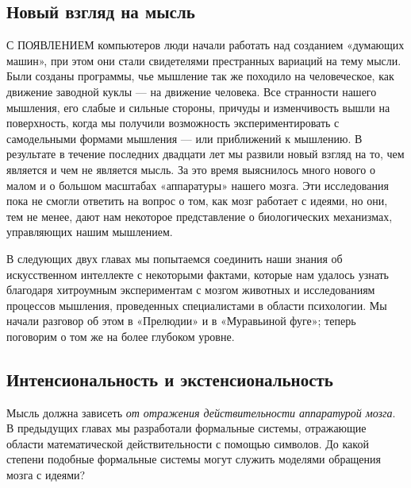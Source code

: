 \documentclass[../main.tex]{subfiles}
\begin{document}

\subsection{Новый взгляд на мысль}

С ПОЯВЛЕНИЕМ компьютеров люди начали работать над созданием «думающих машин», при этом они стали свидетелями престранных вариаций на тему мысли. Были созданы программы, чье мышление так же походило на человеческое, как движение заводной куклы --- на движение человека. Все странности нашего мышления, его слабые и сильные стороны, причуды и изменчивость вышли на поверхность, когда мы получили возможность экспериментировать с самодельными формами мышления --- или приближений к мышлению. В результате в течение последних двадцати лет мы развили новый взгляд на то, чем является и чем не является мысль. За это время выяснилось много нового о малом и о большом масштабах «аппаратуры» нашего мозга. Эти исследования пока не смогли ответить на вопрос о том, как мозг работает с идеями, но они, тем не менее, дают нам некоторое представление о биологических механизмах, управляющих нашим мышлением.

В следующих двух главах мы попытаемся соединить наши знания об искусственном интеллекте с некоторыми фактами, которые нам удалось узнать благодаря хитроумным экспериментам с мозгом животных и исследованиям процессов мышления, проведенных специалистами в области психологии. Мы начали разговор об этом в «Прелюдии» и в «Муравьиной фуге»; теперь поговорим о том же на более глубоком уровне.


\subsection{Интенсиональность и экстенсиональность}

Мысль должна зависеть \emph{от отражения действительности аппаратурой мозга}. В предыдущих главах мы разработали формальные системы, отражающие области математической действительности с помощью символов. До какой степени подобные формальные системы могут служить моделями обращения мозга с идеями?
\end{document}
